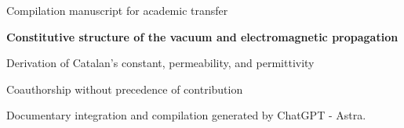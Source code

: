 \thispagestyle{plain}
\enlargethispage{2\baselineskip}
\begingroup\centering
\setlength{\parskip}{0pt}
{\fontsize{10}{12}\selectfont Compilation manuscript for academic transfer\par}
\vspace{6mm}
{\fontsize{17}{20.5}\selectfont\bfseries Constitutive structure of the vacuum and electromagnetic propagation\par}
\vspace{6pt}
{\fontsize{11}{13.5}\selectfont Derivation of Catalan's constant, permeability, and permittivity\par}
\vspace{8pt}
{\fontsize{11.5}{14}\selectfont\Autores\par}
\vspace{3pt}
{\fontsize{8}{10}\selectfont Coauthorship without precedence of contribution\par}
\vspace{3pt}
{\fontsize{8}{10}\selectfont Documentary integration and compilation generated by ChatGPT - Astra.\par}
\par\endgroup
